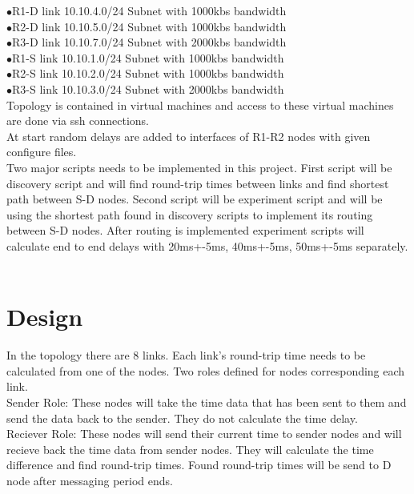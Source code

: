 \documentclass[conference]{IEEEtran}
\begin{document}
$\bullet$R1-D link 10.10.4.0/24 Subnet with 1000kbs bandwidth\\

$\bullet$R2-D link 10.10.5.0/24 Subnet with 1000kbs bandwidth\\

$\bullet$R3-D link 10.10.7.0/24 Subnet with 2000kbs bandwidth\\

$\bullet$R1-S link 10.10.1.0/24 Subnet with 1000kbs bandwidth\\

$\bullet$R2-S link 10.10.2.0/24 Subnet with 1000kbs bandwidth\\

$\bullet$R3-S link 10.10.3.0/24 Subnet with 2000kbs bandwidth\\

Topology is contained in virtual machines and access to these virtual machines are done via ssh connections.\\

At start random delays are added to interfaces of R1-R2 nodes with given configure files.\\

Two major scripts needs to be implemented in this project. First script will be discovery script and will find round-trip times between links and find shortest path between S-D nodes. Second script will be experiment script and will be using the shortest path found in discovery scripts to implement its routing between S-D nodes. After routing is implemented experiment scripts will calculate end to end delays with 20ms+-5ms, 40ms+-5ms, 50ms+-5ms separately.\\ \quad \\

\section{Design}

In the topology there are 8 links. Each link's round-trip time needs to be calculated from one of the nodes. Two roles defined for nodes corresponding each link. \\

Sender Role: These nodes will take the time data that has been sent to them and send the data back to the sender. They do not calculate the time delay.\\

Reciever Role: These nodes will send their current time to sender nodes and will recieve back the time data from sender nodes. They will calculate the time difference and find round-trip times. Found round-trip times will be send to D node after messaging period ends.\\
\end{document}
